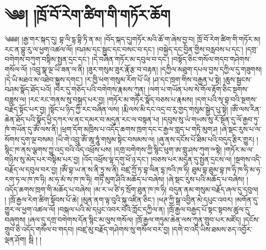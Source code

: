 \chapter{༄༅། །ཁྲོ་བོ་རེག་ཚིག་གི་གཏོར་ཆོག}༄༅༅། །རྒྱ་གར་སྐད་དུ། བྷ་ལི་དྷ་བྷི་ཏི་ན་མ། །བོད་སྐད་དུ།གཏོར་མའི་ཆོ་ག་ཞེས་བྱ་བ། ཁྲོ་བོ་རེག་ཚིག་གི་གཏོར་མ། རང་ན་བྷུ་རུ་ལ་ཕྱག་འཚལ་ལོ། །བཤམ་དང་སྦྱང་དང་བསང་བ་དང་། །བསྐྱེད་དང་བྱིན་གྱིས་བརླབས་པ་དང་། །དགྲ་བགེགས་བཀུག་བསྟིམ་སྤྱན་དྲང་དང་། །དེ་བཞིན་གཏོར་མ་དབུལ་བ་དང་། །བསྟོད་ཅིང་གསོལ་གདབ་གཤེགས་གསོལ་ལོ། །འབྲུ་སྣ་ལྔ་ཡི་ཟན་ལ་ནི། །ཟུར་གསུམ་ཟུར་རྣོ་རྩ་བ་བརྟན། །དཀྱིལ་མཐུག་དཔལ་བྱས་དཀྱིལ་དུ་གཟུགས། །དེ་ཡི་མཐའ་མ་འཐེབ་སྐྱུས་དགང་། །ར་ཁྱི་ཕག་གསུམ་རོག་པོ་ཡི། །ཤ་དང་ཁྲག་གིས་བརྒྱན་པ་སྟེ། །ཆུས་སྦྱངས་བཤམ་སྣོད་ཐོད་པའོ། །བར་དུ་གཅོད་པའི་བགེགས་རྣམས་ཀུན། །ལག་པ་གཡོན་པས་སེ་གོལ་རྟོག་ཅིང་སྔགས་བཟླས་ལ། །རང་རང་གནས་སུ་བསྐྲད་པར་བྱ། །གཏོར་མ་གཏོར་སྣོད་བཅས་པ་རྣམས། །དག་པའི་སྭ་བྷ་བའི་སྔགས་བརྗོད་སྟོང་པར་བྱ། །སྟོང་པ་ཉིད་ཀྱི་རང་བཞིན་ལས། །རྨི་ལས་མི་དང་འདྲ་བ་རུ་གྱད་གསུམ་སྒྱེད་པུ་སྟེ། །ཨོཾ་ལས་རིན་ཆེན་ཐོད་པའི་སྣོད་ཕྱི་དཀར་ལ་ནང་དམར་བ་མདུན་རང་ལ་བསྟན་པ། །དབུས་སུ་ཡཾ་གཡས་སུ་རོ་སྔོན་དུ་ལོ་རྒྱབ་ཏུ་ཁཾ་གཡོན་དུ་ཨོཾ་ལས་ནི། །ཕྲག་དོག་མཁྲིས་པ་འདོད་ཆགས་ཁྲག་དང་ང་རྒྱལ་གླད་པ་གཏི་མུག་ཤ །ཞེ་སྡང་རུས་པ་ལ་སོགས་དུག་ལྔ་བསམ། །ཡི་གེ་འབྲུ་ཨོཾ་ཨཱ་ཧཱུཾ་གསུམ་སྟེང་བསམས་ལ། །ཞུ་ནས་དངོས་པོ་ཐིམ་པའི་བདུད་རྩིར་གྱུར། །སྙིང་ཁ་ནས་ལྕགས་ཀྱུ་འདྲ་བའི་འོད་འཕྲོས་པས། །དགྲ་བགེགས་ཀྱི་སྙིང་ཕུག་ཨ་གླུ་ཤས་ཀུག་ྋསྟེ། །གཏོར་མ་ལ་གཉིས་སུ་མེད་པར་བསྟིམ་པར་བྱ། །འོད་འཕྲོས་ལྷ་དགུ་ཕོ་ཉ་དང་། །བཅས་པར་མདུན་དུ་སྤྱན་དྲངས་ལ། །སྔགས་འདི་བརྗོད་ལ་དབུལ་བར་བྱ། །ཨོཾ་བྷ་ཡ་ན་ས་ནི་ཏྲཱ་ས་ནི། བཛྲ་ཀྲོ་ཏ་བྷ་ལིན་དྷ་ཁའི་ཁ་ཧི། ཐུམ་བྷ་ཐུམ་བྷ་ཁ་ཧི་ཁ་ཧི་མ་ཧ་རག་ཏ་ལ་ཁ་ཁ་ཧི། མ་ཧ་མཾ་ས་ཁ་ཁ་ཧི། གཏི་མུག་ཤིའི་མཆོད་པ་བཞེས། །ཞེ་སྡང་རུས་པའི་མཆོད་པ་བཞེས། །འདོད་ཆགས་ཁྲག་གི་མཆོད་པ་བཞེས། །མ་ར་ཡ་ཙི་ཏ་སྲོག་ཐུན་ཁ་ཁ་ཧི། བདུན་ནམ་གསུམ་བརྗོད་ཞལ་དུ་དབུལ། ། །ཁྲོ་རྒྱལ་རེག་ཚིག་སྟོབས་པོ་ཆེ། །མུན་ནག་ལྟ་བུའི་སྐུ་འཛིན་ཅིང་། །ཕཊ་ཀྱི་སྒྲ་འབྱིན་མེ་དཔུང་འབར། །མགོན་དུ་གྱུར་ལ་ཕྱག་འཚལ་ལོ། །བསྐལ་པའི་མེ་དཔུང་འབར་བའི་ཀློང་དཀྱིལ་ན། །ཁྲོ་རྒྱལ་བརྒྱད་པོ་སྟང་སྟབས་ཚུལ་དུ་བཞུགས། །ཞལ་དུ་དགྲ་བགེགས་དོན་སྙིང་མ་ལུས་གསོལ། །ཁྲོ་རྒྱལ་གཏུམ་ཆེན་ལས་ཀུན་གྲུབ་པར་མཛོད། །དངོས་གྲུབ་ཅི་འདོད་གསོལ་བ་གདབ། །བཛྲ་མུ་བརྗོད་གཤེགས་སུ་གསོལ་བར་བྱ། །དགེ་བ་འདི་ཡིས་ཐམས་ཅད་འབྱོར་ལྡན་ཤོག། སྦི  ། །